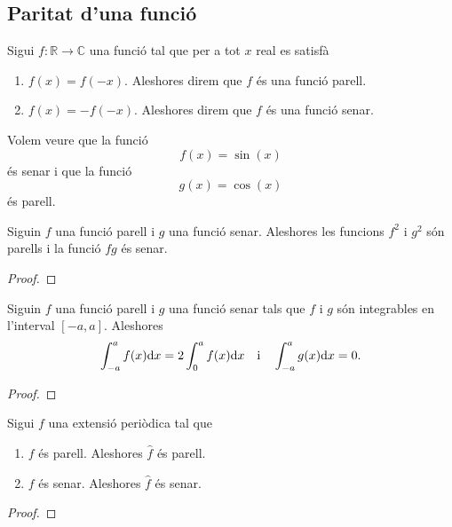 \documentclass[../Apunts.tex]{subfiles}
\begin{document}
	\subsection{Paritat d'una funció}
	\begin{definition}
		\label{def:funció parell}
		\label{def:funció senar}
		Sigui \(f\colon\mathbb{R}\longrightarrow\mathbb{C}\) una funció tal que per a tot \(x\) real es satisfà
		\begin{enumerate}
			\item \(f(x)=f(-x)\). Aleshores direm que \(f\) és una funció parell.
			\item \(f(x)=-f(-x)\). Aleshores direm que \(f\) és una funció senar.
		\end{enumerate}
	\end{definition}
	\begin{example}
		\label{ex:el sinus és una funció senar}
		\label{ex:el cosinus és una funció parell}
		Volem veure que la funció
		\[f(x)=\sin(x)\]
		és senar i que la funció
		\[g(x)=\cos(x)\]
		és parell.
		\begin{solution}
		\end{solution}
	\end{example}
	\begin{proposition}
		\label{prop:la paritat de funcions es comporta com el producte de signes}
		Siguin \(f\) una funció parell i \(g\) una funció senar. Aleshores les funcions \(f^{2}\) i \(g^{2}\) són parells i la funció \(fg\) és senar.
		\begin{proof}
		\end{proof}
	\end{proposition}
	\begin{proposition}
		\label{prop:la integral d'una funció parell en un interval simètric és el doble que en mig interval}
		\label{prop:la integral d'una funció senar en un interval simètric és 0}
		Siguin \(f\) una funció parell i \(g\) una funció senar tals que \(f\) i \(g\) són integrables en l'interval \([-a,a]\). Aleshores
		\[\int_{-a}^{a}f(x)\mathrm{d} x=2\int_{0}^{a}f(x)\mathrm{d} x\quad\text{i}\quad\int_{-a}^{a}g(x)\mathrm{d} x=0.\]
		\begin{proof}
		\end{proof}
	\end{proposition}
	\begin{lemma}
		\label{lema:la paritat d'una funció es conserva en els coeficients de fourier}
		Sigui \(f\) una extensió periòdica tal que
		\begin{enumerate}
			\item \(f\) és parell. Aleshores \(\widehat{f}\) és parell.
			\item \(f\) és senar. Aleshores \(\widehat{f}\) és senar.
		\end{enumerate}
		\begin{proof}
		\end{proof}
	\end{lemma}
\end{document}
